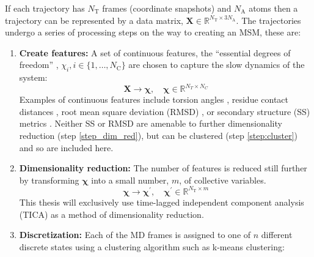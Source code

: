 If  each trajectory has $N_{\mathrm{T}}$ frames (coordinate snapshots) and $N_{\mathrm{A}}$ atoms then a trajectory can be represented by a data matrix, $\mathbf{X} \in \mathbb{R}^{N_{\mathrm{T}} \times 3N_{\mathrm{A}}}$. The trajectories  undergo a series of processing steps on the way to creating an MSM, these are: 

\begin{enumerate}
    \item \textbf{Create features:} A set of continuous features, the ``essential degrees of freedom'' \cite{schutteDirectApproachConformational1999}, $\chi_{i}, i \in \{1,\dots, N_{\mathrm{C}} \}$ are chosen to capture the slow dynamics of the system:
    \begin{equation*}
        \mathbf{X}  \rightarrow \bm{\chi},\quad \bm{\chi} \in \mathbb{R}^{N_{T} \times N_{C}}
    \end{equation*}
    Examples of continuous features include torsion angles \cite{noeHierarchicalAnalysisConformational2007}\cite{choderaLongTimeProtein2006a}\cite{kubeCoarseGrainingMethod2007b}\cite{bucheteCoarseMasterEquations2008a}, residue contact distances \cite{stanleyKineticModulationDisordered2014}\cite{zhouDistributionReciprocalInteratomic2012}\cite{shuklaConformationalHeterogeneityCalmodulin2016},  root mean square deviation (RMSD) \cite{noe2009constructing}\cite{bowmanAtomisticFoldingSimulations2011a}, or secondary structure (SS) metrics \cite{muffKineticAnalysisMolecular2008}. Neither SS or RMSD are amenable to further dimensionality reduction (step \ref{step_dim_red}), but can be clustered (step \ref{step:cluster}) and so are included here. 
    \item \textbf{Dimensionality reduction:} The number of features is reduced still further by transforming $\bm{\chi}$ into a small number, $m$, of collective variables. 
    \begin{equation*}
        \bm{\chi}  \rightarrow \bm{\chi}^{\prime},\quad \bm{\chi}^{\prime} \in \mathbb{R}^{N_{\mathrm{T}} \times m}
    \end{equation*}
    This thesis will exclusively use time-lagged independent component analysis (TICA)  as a method of dimensionality reduction. \cite{perez-hernandezIdentificationSlowMolecular2013a} \cite{schwantesImprovementsMarkovState2013}  \label{step_dim_red}
    \item \textbf{Discretization:} Each of the MD frames is assigned to one of $n$ different discrete states using a clustering algorithm such as k-means \cite{lloydLeastSquaresQuantization1982} clustering: 

\end{enumerate}

